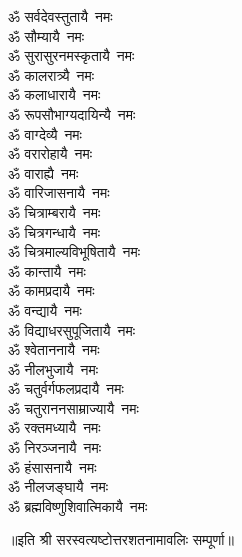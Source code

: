 \begin{multicols}{2}
\begin{flushleft}
ॐ सर्वदेवस्तुतायै~नमः\\
ॐ सौम्यायै~नमः\\
ॐ सुरासुरनमस्कृतायै~नमः\\
ॐ कालरात्र्यै~नमः\\
ॐ कलाधारायै~नमः\\
ॐ रूपसौभाग्यदायिन्यै~नमः\\
ॐ वाग्देव्यै~नमः\\
ॐ वरारोहायै~नमः\hfill{}\\
ॐ वाराह्यै~नमः\\
ॐ वारिजासनायै~नमः\\
ॐ चित्राम्बरायै~नमः\\
ॐ चित्रगन्धायै~नमः\\
ॐ चित्रमाल्यविभूषितायै~नमः\\
ॐ कान्तायै~नमः\\
ॐ कामप्रदायै~नमः\\
ॐ वन्द्यायै~नमः\\
ॐ विद्याधरसुपूजितायै~नमः\\
ॐ श्वेताननायै~नमः\hfill{}\\
ॐ नीलभुजायै~नमः\\
ॐ चतुर्वर्गफलप्रदायै~नमः\\
ॐ चतुराननसाम्राज्यायै~नमः\\
ॐ रक्तमध्यायै~नमः\\
ॐ निरञ्जनायै~नमः\\
ॐ हंसासनायै~नमः\\
ॐ नीलजङ्घायै~नमः\\
ॐ ब्रह्मविष्णुशिवात्मिकायै~नमः\\
\end{flushleft}
\end{multicols}
॥इति श्री सरस्वत्यष्टोत्तरशतनामावलिः सम्पूर्णा॥

